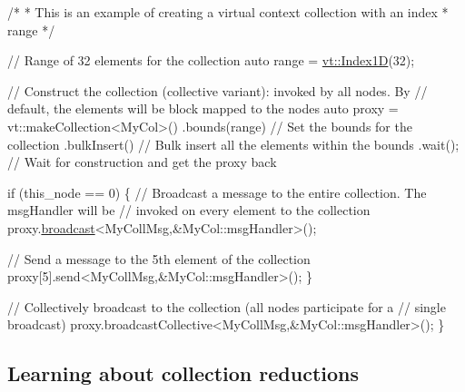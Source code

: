 \begin{DoxyCodeInclude}
  \textcolor{comment}{/*}
\textcolor{comment}{   * This is an example of creating a virtual context collection with an index}
\textcolor{comment}{   * range}
\textcolor{comment}{   */}

  \textcolor{comment}{// Range of 32 elements for the collection}
  \textcolor{keyword}{auto} range = \hyperlink{namespacevt_a5540efc78234273e1796fb003fe4d234}{vt::Index1D}(32);

  \textcolor{comment}{// Construct the collection (collective variant): invoked by all nodes. By}
  \textcolor{comment}{// default, the elements will be block mapped to the nodes}
  \textcolor{keyword}{auto} proxy = vt::makeCollection<MyCol>()
    .bounds(range)    \textcolor{comment}{// Set the bounds for the collection}
    .bulkInsert()     \textcolor{comment}{// Bulk insert all the elements within the bounds}
    .wait();          \textcolor{comment}{// Wait for construction and get the proxy back}

  \textcolor{keywordflow}{if} (this\_node == 0) \{
    \textcolor{comment}{// Broadcast a message to the entire collection. The msgHandler will be}
    \textcolor{comment}{// invoked on every element to the collection}
    proxy.\hyperlink{structvt_1_1objgroup_1_1proxy_1_1_proxy_a0b716ca776b1f06e0d7d45afbe9e5274}{broadcast}<MyCollMsg,&MyCol::msgHandler>();

    \textcolor{comment}{// Send a message to the 5th element of the collection}
    proxy[5].send<MyCollMsg,&MyCol::msgHandler>();
  \}

  \textcolor{comment}{// Collectively broadcast to the collection (all nodes participate for a}
  \textcolor{comment}{// single broadcast)}
  proxy.broadcastCollective<MyCollMsg,&MyCol::msgHandler>();
\}
\end{DoxyCodeInclude}
\hypertarget{tutorial-2b}{}\subsection{Learning about collection reductions}\label{tutorial-2b}

